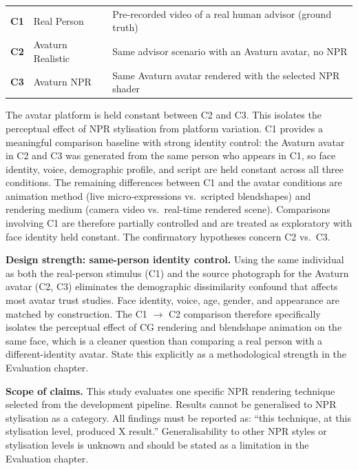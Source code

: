 \documentclass[11pt, a4paper]{article}
\begin{document}
\begin{infobox}
\begin{tabular}{@{}lll}
\textbf{C1} & Real Person & Pre-recorded video of a real human advisor (ground truth) \\[4pt]
\textbf{C2} & Avaturn Realistic & Same advisor scenario with an Avaturn avatar, no NPR \\[4pt]
\textbf{C3} & Avaturn NPR & Same Avaturn avatar rendered with the selected NPR shader \\
\end{tabular}
\end{infobox}

The avatar platform is held constant between C2 and C3. This isolates the perceptual effect of NPR stylisation from platform variation. C1 provides a meaningful comparison baseline with strong identity control: the Avaturn avatar in C2 and C3 was generated from the same person who appears in C1, so face identity, voice, demographic profile, and script are held constant across all three conditions. The remaining differences between C1 and the avatar conditions are animation method (live micro-expressions vs.\ scripted blendshapes) and rendering medium (camera video vs.\ real-time rendered scene). Comparisons involving C1 are therefore partially controlled and are treated as exploratory with face identity held constant. The confirmatory hypotheses concern C2 vs.\ C3.

\begin{infobox}
\small\textbf{Design strength: same-person identity control.} Using the same individual as both the real-person stimulus (C1) and the source photograph for the Avaturn avatar (C2, C3) eliminates the demographic dissimilarity confound that affects most avatar trust studies. Face identity, voice, age, gender, and appearance are matched by construction. The C1 $\to$ C2 comparison therefore specifically isolates the perceptual effect of CG rendering and blendshape animation on the same face, which is a cleaner question than comparing a real person with a different-identity avatar. State this explicitly as a methodological strength in the Evaluation chapter.
\end{infobox}

\begin{warnbox}
\small\textbf{Scope of claims.} This study evaluates one specific NPR rendering technique selected from the development pipeline. Results cannot be generalised to NPR stylisation as a category. All findings must be reported as: ``this technique, at this stylisation level, produced X result.'' Generalisability to other NPR styles or stylisation levels is unknown and should be stated as a limitation in the Evaluation chapter.
\end{warnbox}
\end{document}
